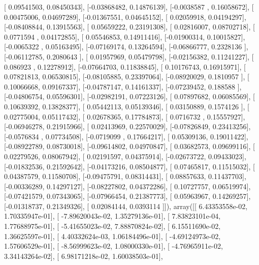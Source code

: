 \documentclass{article}
\begin{document}
       [ 0.09541503,  0.08450343],
       [-0.03868482,  0.14876139],
       [-0.0038587 ,  0.16058672],
       [ 0.00475006,  0.04697289],
       [-0.01367551,  0.04645152],
       [ 0.02059918,  0.04194297],
       [-0.08408844,  0.13915563],
       [ 0.05659222,  0.23191308],
       [ 0.02816007,  0.08702718],
       [ 0.0771594 ,  0.04172855],
       [ 0.05546853,  0.14911416],
       [-0.01900314,  0.10015827],
       [-0.0065322 ,  0.05163495],
       [-0.07169174,  0.13264594],
       [-0.06866777,  0.2328136 ],
       [-0.06112785,  0.2080643 ],
       [ 0.01957969,  0.05479798],
       [-0.02156382,  0.11241227],
       [ 0.086923  ,  0.12278912],
       [-0.07664703,  0.11838845],
       [ 0.10176743,  0.16915971],
       [ 0.07821813,  0.06530815],
       [-0.08105885,  0.23397064],
       [-0.08920029,  0.1810957 ],
       [ 0.10066668,  0.09167337],
       [-0.04787147,  0.14161337],
       [-0.07239452,  0.188588  ],
       [-0.04806754,  0.05596301],
       [-0.02982191,  0.07223126],
       [ 0.07897682,  0.06085569],
       [ 0.10639392,  0.13828377],
       [ 0.05442113,  0.05139346],
       [ 0.03150889,  0.1574126 ],
       [ 0.02775004,  0.05117432],
       [ 0.02678365,  0.17784873],
       [ 0.0716732 ,  0.15557927],
       [-0.06946278,  0.21915966],
       [ 0.02413969,  0.22570029],
       [-0.07826849,  0.23413256],
       [-0.0576834 ,  0.07734508],
       [-0.0719099 ,  0.17664217],
       [ 0.05309136,  0.19011422],
       [-0.08922789,  0.08730018],
       [-0.09614802,  0.04970847],
       [ 0.03682573,  0.09699116],
       [ 0.02279526,  0.08067942],
       [ 0.02191597,  0.04375914],
       [-0.02673722,  0.09433023],
       [-0.01832536,  0.21592642],
       [-0.04173216,  0.08504877],
       [ 0.07465817,  0.11515032],
       [ 0.04387579,  0.11580708],
       [-0.09475791,  0.08314431],
       [ 0.08857633,  0.11437703],
       [-0.00336289,  0.14297127],
       [-0.08227802,  0.04372286],
       [ 0.10727757,  0.06519974],
       [-0.07421579,  0.07343065],
       [-0.07966454,  0.21387773],
       [ 0.05963967,  0.14269257],
       [-0.01318737,  0.21349326],
       [ 0.02084144,  0.0393114 ]]), array([[  6.43353558e-02,   1.70335947e-01],
       [ -7.89620043e-02,   1.35279136e-01],
       [  7.83823101e-04,   1.77688975e-01],
       [ -5.41655023e-02,   7.88870824e-02],
       [  6.15511690e-02,   1.36625597e-01],
       [  4.40332624e-03,   1.06184496e-01],
       [ -4.69124973e-02,   1.57606529e-01],
       [ -8.56999623e-02,   1.08000330e-01],
       [ -4.76965911e-02,   3.34143264e-02],
       [  6.98171218e-02,   1.60038503e-01],
\end{document}

